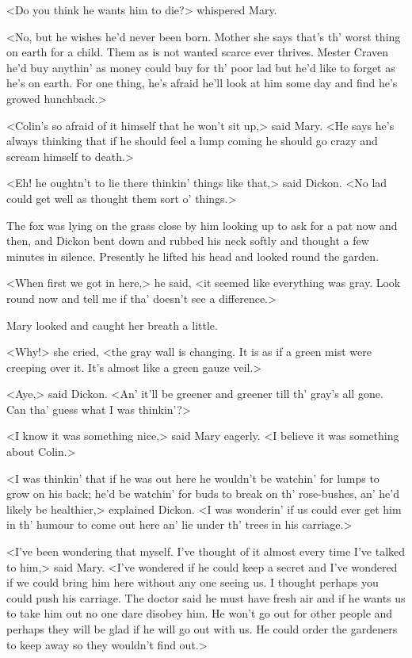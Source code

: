 <Do you think he wants him to die?> whispered Mary.

<No, but he wishes he'd never been born. Mother she says that's th' worst thing on earth for a child. Them as is not wanted scarce ever thrives. Mester Craven he'd buy anythin' as money could buy for th' poor lad but he'd like to forget as he's on earth. For one thing, he's afraid he'll look at him some day and find he's growed hunchback.>

<Colin's so afraid of it himself that he won't sit up,> said Mary. <He says he's always thinking that if he should feel a lump coming he should go crazy and scream himself to death.>

<Eh! he oughtn't to lie there thinkin' things like that,> said Dickon. <No lad could get well as thought them sort o' things.>

The fox was lying on the grass close by him looking up to ask for a pat now and then, and Dickon bent down and rubbed his neck softly and thought a few minutes in silence. Presently he lifted his head and looked round the garden.

<When first we got in here,> he said, <it seemed like everything was gray. Look round now and tell me if tha' doesn't see a difference.>

Mary looked and caught her breath a little.

<Why!> she cried, <the gray wall is changing. It is as if a green mist were creeping over it. It's almost like a green gauze veil.>

<Aye,> said Dickon. <An' it'll be greener and greener till th' gray's all gone. Can tha' guess what I was thinkin'?>

<I know it was something nice,> said Mary eagerly. <I believe it was something about Colin.>

<I was thinkin' that if he was out here he wouldn't be watchin' for lumps to grow on his back; he'd be watchin' for buds to break on th' rose-bushes, an' he'd likely be healthier,> explained Dickon. <I was wonderin' if us could ever get him in th' humour to come out here an' lie under th' trees in his carriage.>

<I've been wondering that myself. I've thought of it almost every time I've talked to him,> said Mary. <I've wondered if he could keep a secret and I've wondered if we could bring him here without any one seeing us. I thought perhaps you could push his carriage. The doctor said he must have fresh air and if he wants us to take him out no one dare disobey him. He won't go out for other people and perhaps they will be glad if he will go out with us. He could order the gardeners to keep away so they wouldn't find out.>

